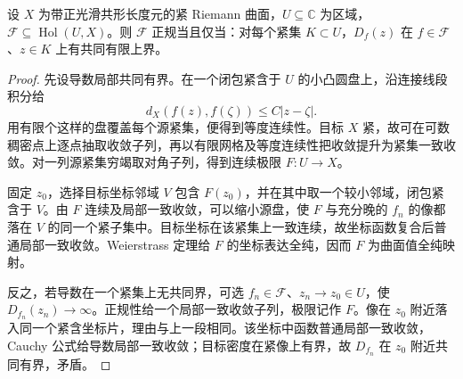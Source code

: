 \begin{lemma}[紧曲面目标的导数判别]\label{b3:lem:14-compact-target-normality}
设 \(X\) 为带正光滑共形长度元的紧 Riemann 曲面，\(U\subseteq\mathbb C\) 为区域，\(\mathcal F\subseteq\operatorname{Hol}(U,X)\)。则 \(\mathcal F\) 正规当且仅当：对每个紧集 \(K\subset U\)，\(D_f(z)\) 在 \(f\in\mathcal F\)、\(z\in K\) 上有共同有限上界。
\end{lemma}
\begin{proof}
先设导数局部共同有界。在一个闭包紧含于 \(U\) 的小凸圆盘上，沿连接线段积分给
\[
 d_X(f(z),f(\zeta))\le C|z-\zeta|.
\]
用有限个这样的盘覆盖每个源紧集，便得到等度连续性。目标 \(X\) 紧，故可在可数稠密点上逐点抽取收敛子列，再以有限网格及等度连续性把收敛提升为紧集一致收敛。对一列源紧集穷竭取对角子列，得到连续极限 \(F:U\to X\)。

固定 \(z_0\)，选择目标坐标邻域 \(V\) 包含 \(F(z_0)\)，并在其中取一个较小邻域，闭包紧含于 \(V\)。由 \(F\) 连续及局部一致收敛，可以缩小源盘，使 \(F\) 与充分晚的 \(f_n\) 的像都落在 \(V\) 的同一个紧子集中。目标坐标在该紧集上一致连续，故坐标函数复合后普通局部一致收敛。Weierstrass 定理给 \(F\) 的坐标表达全纯，因而 \(F\) 为曲面值全纯映射。

反之，若导数在一个紧集上无共同界，可选 \(f_n\in\mathcal F\)、\(z_n\to z_0\in U\)，使 \(D_{f_n}(z_n)\to\infty\)。正规性给一个局部一致收敛子列，极限记作 \(F\)。像在 \(z_0\) 附近落入同一个紧含坐标片，理由与上一段相同。该坐标中函数普通局部一致收敛，Cauchy 公式给导数局部一致收敛；目标密度在紧像上有界，故 \(D_{f_n}\) 在 \(z_0\) 附近共同有界，矛盾。
\end{proof}

